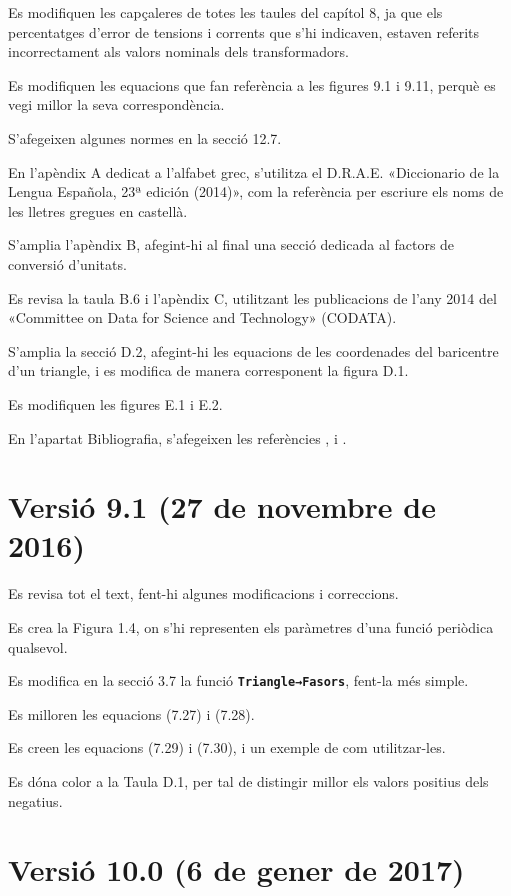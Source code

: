 Es modifiquen les capçaleres de totes les taules del capítol 8, ja que els percentatges d'error de tensions i corrents que s'hi indicaven, estaven referits incorrectament als valors nominals dels transformadors.

Es modifiquen les equacions que fan referència a les figures 9.1 i 9.11, perquè es vegi millor la seva correspondència.

S'afegeixen algunes normes en la secció 12.7.

En l'apèndix A dedicat a l'alfabet grec, s'utilitza el D.R.A.E.
«Diccionario de la Lengua Española, 23ª
edición (2014)», com la referència per escriure els noms de les lletres gregues en castellà.

S'amplia l'apèndix B, afegint-hi al final una secció dedicada al factors de conversió d'unitats.

Es revisa la taula B.6 i l'apèndix C, utilitzant les publicacions de l'any 2014 del «Committee on Data for Science and Technology» (CODATA).


S'amplia la secció D.2, afegint-hi les equacions de les coordenades del baricentre d'un triangle, i es modifica de manera corresponent la figura D.1.

Es modifiquen les figures E.1 i E.2.

En l'apartat Bibliografia, s'afegeixen les referències \cite{VOS}, \cite{WMF} i \cite{TRA}.


\section*{Versió 9.1 (27 de novembre de 2016)}

Es revisa tot el text, fent-hi algunes  modificacions i correccions.

Es crea la Figura 1.4, on s'hi representen els paràmetres d'una funció periòdica qualsevol.

Es modifica en la secció 3.7 la funció \texttt{\textbf{Triangle→Fasors}}, fent-la més simple.

Es milloren les equacions (7.27) i (7.28).

Es creen les equacions (7.29) i (7.30), i un exemple de com utilitzar-les.

Es dóna color a la Taula D.1, per tal de distingir millor els valors positius dels negatius.

\section*{Versió 10.0 (6 de gener de 2017)}

